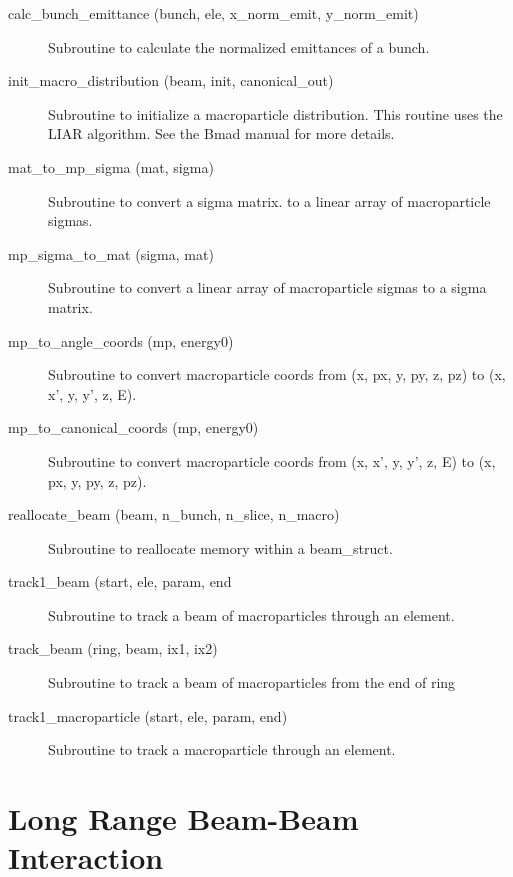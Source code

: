 \begin{description}

\item[calc\_bunch\_emittance (bunch, ele, x\_norm\_emit, y\_norm\_emit)] \Newline 
Subroutine to calculate the normalized emittances of a bunch.

\item[init\_macro\_distribution (beam, init, canonical\_out)] \Newline 
Subroutine to initialize a macroparticle distribution.
This routine uses the LIAR algorithm. See the Bmad manual for more details.

\item[mat\_to\_mp\_sigma (mat, sigma)] \Newline 
Subroutine to convert a sigma matrix. to a linear array of 
macroparticle sigmas.

\item[mp\_sigma\_to\_mat (sigma, mat)] \Newline 
Subroutine to convert a linear array of macroparticle sigmas to a 
sigma matrix. 

\item[mp\_to\_angle\_coords (mp, energy0)] \Newline 
Subroutine to convert macroparticle coords from 
(x, px, y, py, z, pz) to (x, x', y, y', z, E).

\item[mp\_to\_canonical\_coords (mp, energy0)] \Newline 
Subroutine to convert macroparticle coords from 
(x, x', y, y', z, E) to (x, px, y, py, z, pz).

\item[reallocate\_beam (beam, n\_bunch, n\_slice, n\_macro)] \Newline 
Subroutine to reallocate memory within a beam\_struct.

\item[track1\_beam (start, ele, param, end] \Newline
Subroutine to track a beam of macroparticles through an element.

\item[track\_beam (ring, beam, ix1, ix2)] \Newline 
Subroutine to track a beam of macroparticles from the end of
ring%

\item[track1\_macroparticle (start, ele, param, end)] \Newline 
Subroutine to track a macroparticle through an element.


\end{description}

\section{Long Range Beam-Beam Interaction}
\label{r:lrbbi}    

